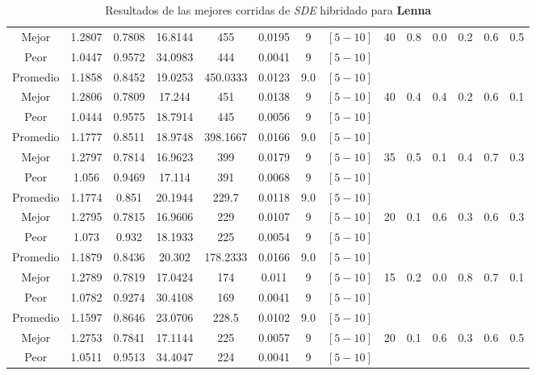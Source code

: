 \begin{table}[h!]
\begin{center}
\begin{tabular}{|c|c|c|c|c|c|c|c|c|c|c|c|c|c|}
            \cline{1-8}
            Mejor & 1.2807 & 0.7808  & 16.8144 & 455 & 0.0195 & 9 & $[5-10]$ & 40 & 0.8 & 0.0 & 0.2 & 0.6 & 0.5\\
            \cline{1-8}
            Peor & 1.0447 & 0.9572  & 34.0983 & 444 & 0.0041 & 9 & $[5-10]$ &  &  &  &  &  & \\
        \hline
        \hline
            Promedio  & 1.1858 & 0.8452 & 19.0253 & 450.0333 & 0.0123 & 9.0 & $[5-10]$ &  &  &  &  &  & \\
            \cline{1-8}
            Mejor & 1.2806 & 0.7809  & 17.244 & 451 & 0.0138 & 9 & $[5-10]$ & 40 & 0.4 & 0.4 & 0.2 & 0.6 & 0.1\\
            \cline{1-8}
            Peor & 1.0444 & 0.9575  & 18.7914 & 445 & 0.0056 & 9 & $[5-10]$ &  &  &  &  &  & \\
        \hline
        \hline
            Promedio  & 1.1777 & 0.8511 & 18.9748 & 398.1667 & 0.0166 & 9.0 & $[5-10]$ &  &  &  &  &  & \\
            \cline{1-8}
            Mejor & 1.2797 & 0.7814  & 16.9623 & 399 & 0.0179 & 9 & $[5-10]$ & 35 & 0.5 & 0.1 & 0.4 & 0.7 & 0.3\\
            \cline{1-8}
            Peor & 1.056 & 0.9469  & 17.114 & 391 & 0.0068 & 9 & $[5-10]$ &  &  &  &  &  & \\
        \hline
        \hline
            Promedio  & 1.1774 & 0.851 & 20.1944 & 229.7 & 0.0118 & 9.0 & $[5-10]$ &  &  &  &  &  & \\
            \cline{1-8}
            Mejor & 1.2795 & 0.7815  & 16.9606 & 229 & 0.0107 & 9 & $[5-10]$ & 20 & 0.1 & 0.6 & 0.3 & 0.6 & 0.3\\
            \cline{1-8}
            Peor & 1.073 & 0.932  & 18.1933 & 225 & 0.0054 & 9 & $[5-10]$ &  &  &  &  &  & \\
        \hline
        \hline
            Promedio  & 1.1879 & 0.8436 & 20.302 & 178.2333 & 0.0166 & 9.0 & $[5-10]$ &  &  &  &  &  & \\
            \cline{1-8}
            Mejor & 1.2789 & 0.7819  & 17.0424 & 174 & 0.011 & 9 & $[5-10]$ & 15 & 0.2 & 0.0 & 0.8 & 0.7 & 0.1\\
            \cline{1-8}
            Peor & 1.0782 & 0.9274  & 30.4108 & 169 & 0.0041 & 9 & $[5-10]$ &  &  &  &  &  & \\
        \hline
        \hline
            Promedio  & 1.1597 & 0.8646 & 23.0706 & 228.5 & 0.0102 & 9.0 & $[5-10]$ &  &  &  &  &  & \\
            \cline{1-8}
            Mejor & 1.2753 & 0.7841  & 17.1144 & 225 & 0.0057 & 9 & $[5-10]$ & 20 & 0.1 & 0.6 & 0.3 & 0.6 & 0.5\\
            \cline{1-8}
            Peor & 1.0511 & 0.9513  & 34.4047 & 224 & 0.0041 & 9 & $[5-10]$ &  &  &  &  &  & \\
        \hline
        \end{tabular}
        \caption{Resultados de las mejores corridas de \emph{SDE} hibridado para {\bf Lenna}}
        \label{tb:tablesdehibimg}
    \end{center}
\end{table}


